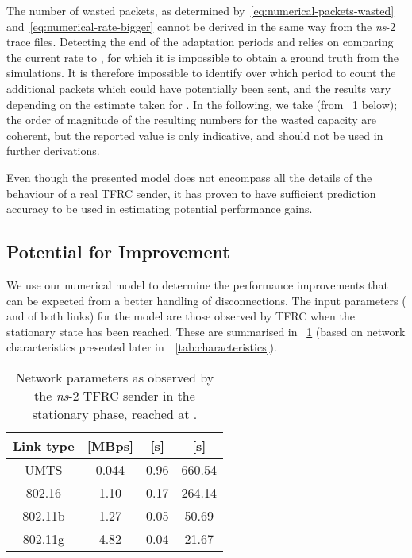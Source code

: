 \documentclass[twocolumn]{nictatechreport}
\newcommand{\ns}{\textit{ns}}
\begin{document}
The number of wasted packets, as determined
by~\eqref{eq:numerical-packets-wasted} and~\eqref{eq:numerical-rate-bigger}
cannot be derived in the same way from the \ns-2 trace files. Detecting the end
of the adaptation periods  and  relies on
comparing the current rate to , for which it is impossible to
obtain a ground truth from the simulations. It is therefore impossible to
identify over which period to count the additional packets which could have
potentially been sent, and the results vary depending on the estimate taken for
. In the following, we take 
(from \tablename~\ref{tab:stationary-params} below); the order of magnitude of the
resulting numbers for the wasted capacity are coherent, but the reported value
is only indicative, and should not be used in further derivations.

Even though the presented model does not encompass all the details of the
behaviour of a real TFRC sender, it has proven to have sufficient prediction
accuracy to be used in estimating potential performance gains.

\subsection{Potential for Improvement}

We use our numerical model to determine the performance improvements that can be
expected from a better handling of disconnections. The input parameters (
and  of both links) for the model are those observed by TFRC when the
stationary state has been reached. These are summarised in
\tablename~\ref{tab:stationary-params} (based on network characteristics
presented later in~\tablename~\ref{tab:characteristics}). 

\begin{table}[tb]
  \centering
  \caption[Network parameters as observed by the \textit{ns}-2 TFRC sender]{Network
  parameters as observed by the \ns-2 TFRC sender in the stationary phase,
  reached at .}
  \label{tab:stationary-params}
  \begin{tabular}{cccc}
    \toprule
    \textbf{Link type} & \textbf{ [MBps]} & \textbf{ [s]} & \textbf{ [s]} \\
    \midrule
    UMTS & 	0.044 & 	0.96 & 	660.54 \\
    802.16 & 	1.10 & 	0.17 & 	264.14 \\
    802.11b & 	1.27 & 	0.05 & 	50.69 \\
    802.11g & 	4.82 & 	0.04 & 	21.67 \\
    \bottomrule
  \end{tabular}
\end{table}
\end{document}
